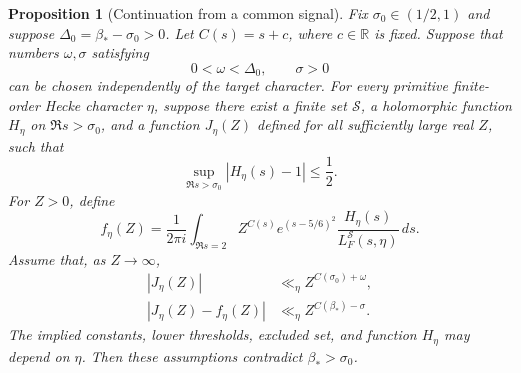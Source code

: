 \documentclass[11pt,a4paper]{article}
\numberwithin{equation}{section}
\numberwithin{figure}{section}
\newtheorem{proposition}[theorem]{Proposition}
\theoremstyle{definition}
\theoremstyle{remark}
\begin{document}
\begin{proposition}[Continuation from a common signal]
\label{lem:continuation-criterion}
Fix $\sigma_0\in(1/2,1)$ and suppose $\Delta_0=\beta_*-\sigma_0>0$.
Let $C(s)=s+c$, where $c\in\mathbb R$ is fixed. Suppose that numbers
$\omega,\sigma$ satisfying
\[
 0<\omega<\Delta_0,\qquad \sigma>0
\]
can be chosen independently of the target character. For every primitive
finite-order Hecke character $\eta$, suppose there exist a finite set
$\mathcal S$, a holomorphic function $H_\eta$ on $\Re s>\sigma_0$, and a
function $J_\eta(Z)$ defined for all sufficiently large real $Z$, such that
\begin{equation}
 \sup_{\Re s>\sigma_0}|H_\eta(s)-1|\le\frac12.
 \label{eq:signal-euler-contract}
\end{equation}
For $Z>0$, define
\begin{equation}
 f_\eta(Z)=\frac1{2\pi i}\int_{\Re s=2}
 Z^{C(s)}e^{(s-5/6)^2}
 \frac{H_\eta(s)}{L_F^{\mathcal S}(s,\eta)}\,ds.
 \label{eq:common-residue}
\end{equation}
Assume that, as $Z\to\infty$,
\begin{align}
 |J_\eta(Z)|&\ll_\eta Z^{C(\sigma_0)+\omega},
       \label{eq:low-probe-contract}\\
 |J_\eta(Z)-f_\eta(Z)|&\ll_\eta Z^{C(\beta_*)-\sigma}.
       \label{eq:high-probe-contract}
\end{align}
The implied constants, lower thresholds, excluded set, and function $H_\eta$
may depend on $\eta$. Then these assumptions contradict $\beta_*>\sigma_0$.
\end{proposition}
\end{document}
